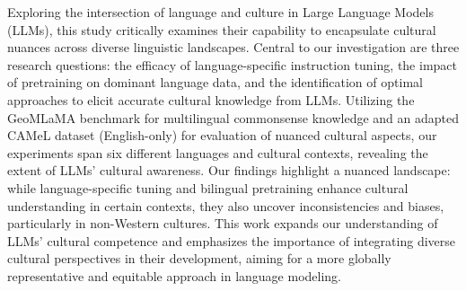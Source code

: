 Exploring the intersection of language and culture in Large Language Models (LLMs), this study critically examines their capability to encapsulate cultural nuances across diverse linguistic landscapes. Central to our investigation are three research questions: the efficacy of language-specific instruction tuning, the impact of pretraining on dominant language data, and the identification of optimal approaches to elicit accurate cultural knowledge from LLMs. Utilizing the GeoMLaMA benchmark for multilingual commonsense knowledge and an adapted CAMeL dataset (English-only) for evaluation of nuanced cultural aspects, our experiments span six different languages and cultural contexts, revealing the extent of LLMs' cultural awareness.  Our findings highlight a nuanced landscape: while language-specific tuning and bilingual pretraining enhance cultural understanding in certain contexts, they also uncover inconsistencies and biases, particularly in non-Western cultures. This work expands our understanding of LLMs' cultural competence and emphasizes the importance of integrating diverse cultural perspectives in their development, aiming for a more globally representative and equitable approach in language modeling.